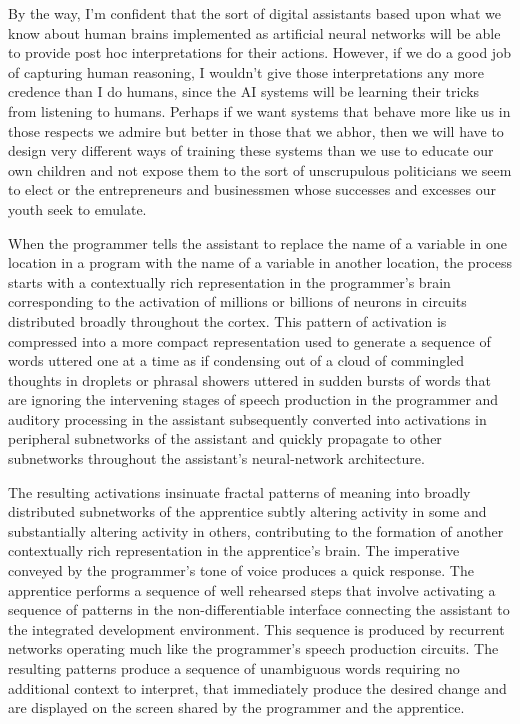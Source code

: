By the way, I'm confident that the sort of digital assistants based upon what we know about human brains implemented as artificial neural networks will be able to provide post hoc interpretations for their actions. However, if we do a good job of capturing human reasoning, I wouldn't give those interpretations any more credence than I do humans, since the AI systems will be learning their tricks from listening to humans. Perhaps if we want systems that behave more like us in those respects we admire but better in those that we abhor, then we will have to design very different ways of training these systems than we use to educate our own children and not expose them to the sort of unscrupulous politicians we seem to elect or the entrepreneurs and businessmen whose successes and excesses our youth seek to emulate.



When the programmer tells the assistant to replace the name of a variable in one location in a program with the name of a variable in another location, the process starts with a contextually rich representation in the programmer’s brain corresponding to the activation of millions or billions of neurons in circuits distributed broadly throughout the cortex. This pattern of activation is compressed into a more compact representation used to generate a sequence of words uttered one at a time as if condensing out of a cloud of commingled thoughts in droplets or phrasal showers uttered in sudden bursts of words that are \emdash{} ignoring the intervening stages of speech production in the programmer and auditory processing in the assistant \emdash{} subsequently converted into activations in peripheral subnetworks of the assistant and quickly propagate to other subnetworks throughout the assistant’s neural-network architecture. 

The resulting activations insinuate fractal patterns of meaning into broadly distributed subnetworks of the apprentice subtly altering activity in some and substantially altering activity in others, contributing to the formation of another contextually rich representation in the apprentice’s brain. The imperative conveyed by the programmer’s tone of voice produces a quick response. The apprentice performs a sequence of well rehearsed steps that involve activating a sequence of patterns in the non-differentiable interface connecting the assistant to the integrated development environment. This sequence is produced by recurrent networks operating much like the programmer’s speech production circuits. The resulting patterns produce a sequence of unambiguous words \emdash{} requiring no additional context to interpret, that immediately produce the desired change and are displayed on the screen shared by the programmer and the apprentice.

